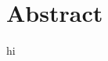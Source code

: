 \documentclass[../main.tex]{subfiles} %
\begin{document}
    \section{Abstract}\label{sec:abstract}
        hi
\end{document}
